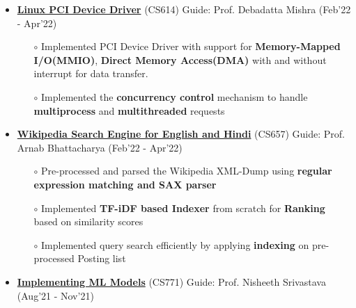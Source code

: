 \documentclass[10.8pt, a4paper]{extarticle}
\begin{document}
\begin{itemize}
\item\href{https://github.com/jeetsarangi/Wikipedia-Article-Retrieval-System} {\textbf{Linux PCI Device Driver}} (CS614) Guide: Prof.  Debadatta Mishra   \hfill(Feb'22 - Apr'22)
	\\[-0.6cm]
	\begin{itemize}
	
	\item [$\circ$] Implemented PCI Device Driver with support for \textbf{Memory-Mapped I/O(MMIO)}, \textbf{Direct Memory Access(DMA)} with and without interrupt for data transfer.\\[-0.6cm]
		
	\item [$\circ$] Implemented the \textbf{concurrency control} mechanism to handle \textbf{multiprocess} and \textbf{multithreaded} requests
	
    
    \end{itemize}

\item\href{https://github.com/jeetsarangi/Wikipedia-Article-Retrieval-System} {\textbf{Wikipedia Search Engine for English and Hindi}} (CS657) Guide: Prof.  Arnab Bhattacharya   \hfill(Feb'22 - Apr'22)
	\\[-0.6cm]
	\begin{itemize}
	
	\item [$\circ$] Pre-processed and parsed the Wikipedia XML-Dump using \textbf{regular expression matching and SAX parser}\\[-0.6cm]
	
	
	\item [$\circ$] Implemented \textbf{TF-iDF based Indexer} from scratch for \textbf{Ranking} based on similarity scores\\[-0.6cm]
	
	\item [$\circ$] Implemented query search efficiently by applying \textbf{indexing} on pre-processed Posting list
	 
    
    \end{itemize}

 \item\href{https://github.com/jeetsarangi/Machine-Learning-CS771-}{\textbf{Implementing ML Models}} (CS771) Guide: Prof. Nisheeth Srivastava \hfill(Aug'21 - Nov'21)
    \\[-0.6cm]
	\begin{itemize}
	   

\end{itemize}
\end{itemize}
\end{document}
